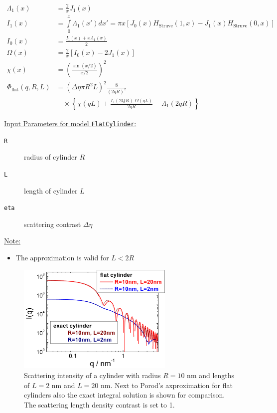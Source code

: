 \begin{align}
\Lambda_1(x) &= \frac{2}{x} J_1(x) \\
I_1(x) &= \int\limits_0^x \Lambda_1(x') dx' = \pi x \left[J_0(x)H_\text{Struve}(1,x)-J_1(x)H_\text{Struve}(0,x)\right]\\
I_0(x) &= \frac{I_1(x)+x\Lambda_1(x)}{2}\\
\Omega(x) &= \frac{2}{x} \left[ I_0(x)-2J_1(x)\right]\\
\chi(x) &= \left( \frac{\sin(x/2)}{x/2}\right)^2\\
\Phi_\text{flat}(q,R,L) &= \left(\Delta\eta\pi R^2L\right)^2 \frac{8}{(2qR)^2}  \label{eq:FlatCylinder}\\
& \quad \times \left\{ \chi(qL) +
\frac{I_1(2QR)\;\Omega(qL)}{2qR}-\Lambda_1(2qR)\right\}\nonumber
\end{align}


\vspace{5mm}

\underline{Input Parameters for model \texttt{FlatCylinder}:}
\begin{description}
\item[\texttt{R}] radius of cylinder $R$
\item[\texttt{L}] length of cylinder $L$
\item[\texttt{eta}] scattering contrast $\Delta\eta$
\end{description}

\underline{Note:}
\begin{itemize}
\item The approximation is valid for $L<2R$
\end{itemize}

\begin{figure}[htb]
\begin{center}
\includegraphics[width=0.668\textwidth,height=0.488\textwidth]{../images/form_factor/cylindrical_obj/FlatCylinder.png}
\end{center}
\caption{Scattering intensity of a cylinder with radius $R=10$ nm and lengths of $L=2$ nm
and $L=20$ nm. Next to Porod's axproximation for flat cylinders also
the exact integral solution is shown for comparison.
The scattering length density contrast is set to 1.}
\label{fig:FlatCylinder}
\end{figure}

